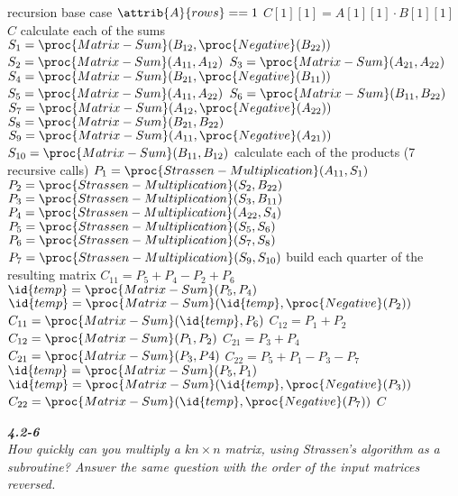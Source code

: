 \documentclass[8pt,a4paper]{article}
\begin{document}
\begin{codebox}
  \li \Comment recursion base case
  \li \If $\attrib{A}{rows} == 1$
        \Then
  \li     $C[1][1] = A[1][1] \cdot B[1][1]$
  \li     \Return $C$
        \End
  \li
  \li \Comment calculate each of the sums
  \li $S_{1}  = \proc{Matrix-Sum}(B_{12}, \proc{Negative}(B_{22}))$
  \li $S_{2}  = \proc{Matrix-Sum}(A_{11}, A_{12})$
  \li $S_{3}  = \proc{Matrix-Sum}(A_{21}, A_{22})$
  \li $S_{4}  = \proc{Matrix-Sum}(B_{21}, \proc{Negative}(B_{11}))$
  \li $S_{5}  = \proc{Matrix-Sum}(A_{11}, A_{22})$
  \li $S_{6}  = \proc{Matrix-Sum}(B_{11}, B_{22})$
  \li $S_{7}  = \proc{Matrix-Sum}(A_{12}, \proc{Negative}(A_{22}))$
  \li $S_{8}  = \proc{Matrix-Sum}(B_{21}, B_{22})$
  \li $S_{9}  = \proc{Matrix-Sum}(A_{11}, \proc{Negative}(A_{21}))$
  \li $S_{10} = \proc{Matrix-Sum}(B_{11}, B_{12})$
  \li
  \li \Comment calculate each of the products (7 recursive calls)
  \li $P_{1} = \proc{Strassen-Multiplication}(A_{11}, S_{1})$
  \li $P_{2} = \proc{Strassen-Multiplication}(S_{2}, B_{22})$
  \li $P_{3} = \proc{Strassen-Multiplication}(S_{3}, B_{11})$
  \li $P_{4} = \proc{Strassen-Multiplication}(A_{22}, S_{4})$
  \li $P_{5} = \proc{Strassen-Multiplication}(S_{5}, S_{6})$
  \li $P_{6} = \proc{Strassen-Multiplication}(S_{7}, S_{8})$
  \li $P_{7} = \proc{Strassen-Multiplication}(S_{9}, S_{10})$
  \li
  \li \Comment build each quarter of the resulting matrix
  \li \Comment $C_{11} = P_{5} + P_{4} - P_{2} + P_{6}$
  \li $\id{temp} = \proc{Matrix-Sum}(P_{5}, P_{4})$
  \li $\id{temp} = \proc{Matrix-Sum}(\id{temp}, \proc{Negative}(P_{2}))$
  \li $C_{11} = \proc{Matrix-Sum}(\id{temp}, P_{6})$
  \li
  \li \Comment $C_{12} = P_{1} + P_{2}$
  \li $C_{12} = \proc{Matrix-Sum}(P_{1}, P_{2})$
  \li
  \li \Comment $C_{21} = P_{3} + P_{4}$
  \li $C_{21} = \proc{Matrix-Sum}(P_{3}, P{4})$
  \li
  \li \Comment $C_{22} = P_{5} + P_{1} - P_{3} - P_{7}$
  \li $\id{temp} = \proc{Matrix-Sum}(P_{5}, P_{1})$
  \li $\id{temp} = \proc{Matrix-Sum}(\id{temp}, \proc{Negative}(P_{3}))$
  \li $C_{22} = \proc{Matrix-Sum}(\id{temp}, \proc{Negative}(P_{7}))$
  \li
  \li \Return $C$
\end{codebox}

\begin{framed}
\textbf{\textit{4.2-6}} \\
\textit{How quickly can you multiply a $kn \times n$ matrix, using Strassen's
algorithm as a subroutine? Answer the same question with the order of the input
matrices reversed.}
\end{framed}
\end{document}
